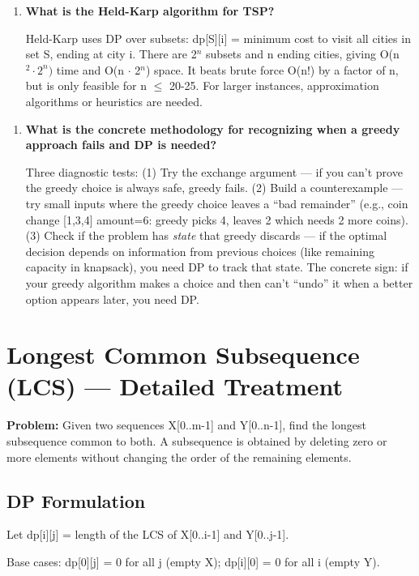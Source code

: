 \begin{enumerate}
\item \textbf{What is the Held-Karp algorithm for TSP?}

Held-Karp uses DP over subsets: dp[S][i] = minimum cost to visit all cities in set S, ending at city i. There are 2$^{n}$ subsets and n ending cities, giving O(n$^{2} \cdot 2^{n})$ time and O(n $\cdot$ 2$^{n}$) space. It beats brute force O(n!) by a factor of n, but is only feasible for n $\le$ 20-25. For larger instances, approximation algorithms or heuristics are needed.
\end{enumerate}

\begin{enumerate}
\item \textbf{What is the concrete methodology for recognizing when a greedy approach fails and DP is needed?}\label{faq:greedy-to-dp-methodology}

Three diagnostic tests: (1) Try the exchange argument — if you can't prove the greedy choice is always safe, greedy fails. (2) Build a counterexample — try small inputs where the greedy choice leaves a ``bad remainder'' (e.g., coin change [1,3,4] amount=6: greedy picks 4, leaves 2 which needs 2 more coins). (3) Check if the problem has \emph{state} that greedy discards — if the optimal decision depends on information from previous choices (like remaining capacity in knapsack), you need DP to track that state. The concrete sign: if your greedy algorithm makes a choice and then can't ``undo'' it when a better option appears later, you need DP.
\end{enumerate}

\section{Longest Common Subsequence (LCS) --- Detailed Treatment}

\textbf{Problem:} Given two sequences X[0..m-1] and Y[0..n-1], find the longest subsequence common to both. A subsequence is obtained by deleting zero or more elements without changing the order of the remaining elements.

\subsection{DP Formulation}

Let dp[i][j] = length of the LCS of X[0..i-1] and Y[0..j-1].

Base cases: dp[0][j] = 0 for all j (empty X); dp[i][0] = 0 for all i (empty Y).

